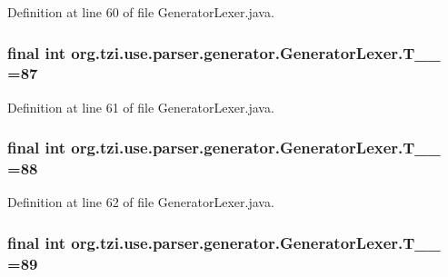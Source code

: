 Definition at line 60 of file Generator\-Lexer.\-java.

\hypertarget{classorg_1_1tzi_1_1use_1_1parser_1_1generator_1_1_generator_lexer_adbb95e43d6b0ee8da7f829712d792a91}{
\subsubsection[{T\-\_\-\-\_\-87}]{\setlength{\rightskip}{0pt plus 5cm}final int org.\-tzi.\-use.\-parser.\-generator.\-Generator\-Lexer.\-T\-\_\-\-\_ =87\hspace{0.3cm}{\ttfamily [static]}}}\label{classorg_1_1tzi_1_1use_1_1parser_1_1generator_1_1_generator_lexer_adbb95e43d6b0ee8da7f829712d792a91}


Definition at line 61 of file Generator\-Lexer.\-java.

\hypertarget{classorg_1_1tzi_1_1use_1_1parser_1_1generator_1_1_generator_lexer_a6d1768e499190b5b581e4ab129e1fe02}{
\subsubsection[{T\-\_\-\-\_\-88}]{\setlength{\rightskip}{0pt plus 5cm}final int org.\-tzi.\-use.\-parser.\-generator.\-Generator\-Lexer.\-T\-\_\-\-\_ =88\hspace{0.3cm}{\ttfamily [static]}}}\label{classorg_1_1tzi_1_1use_1_1parser_1_1generator_1_1_generator_lexer_a6d1768e499190b5b581e4ab129e1fe02}


Definition at line 62 of file Generator\-Lexer.\-java.

\hypertarget{classorg_1_1tzi_1_1use_1_1parser_1_1generator_1_1_generator_lexer_a1a7fe946026e324a5c73ac6d1c5f5397}{
\subsubsection[{T\-\_\-\-\_\-89}]{\setlength{\rightskip}{0pt plus 5cm}final int org.\-tzi.\-use.\-parser.\-generator.\-Generator\-Lexer.\-T\-\_\-\-\_ =89\hspace{0.3cm}{\ttfamily [static]}}}\label{classorg_1_1tzi_1_1use_1_1parser_1_1generator_1_1_generator_lexer_a1a7fe946026e324a5c73ac6d1c5f5397}


